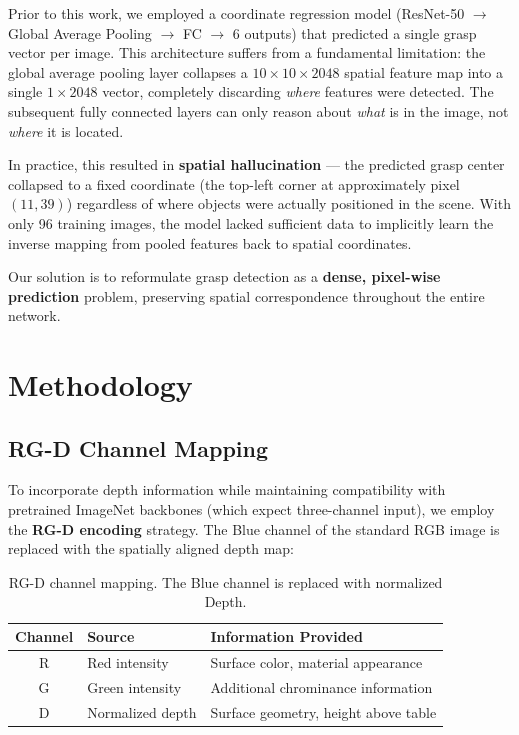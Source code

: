 \documentclass[12pt, a4paper]{article}
\begin{document}
Prior to this work, we employed a coordinate regression model (ResNet-50 $\rightarrow$ Global Average Pooling $\rightarrow$ FC $\rightarrow$ 6 outputs) that predicted a single grasp vector per image. This architecture suffers from a fundamental limitation: the global average pooling layer collapses a $10 \times 10 \times 2048$ spatial feature map into a single $1 \times 2048$ vector, completely discarding \textit{where} features were detected. The subsequent fully connected layers can only reason about \textit{what} is in the image, not \textit{where} it is located.

In practice, this resulted in \textbf{spatial hallucination} — the predicted grasp center collapsed to a fixed coordinate (the top-left corner at approximately pixel $(11, 39)$) regardless of where objects were actually positioned in the scene. With only 96 training images, the model lacked sufficient data to implicitly learn the inverse mapping from pooled features back to spatial coordinates.

Our solution is to reformulate grasp detection as a \textbf{dense, pixel-wise prediction} problem, preserving spatial correspondence throughout the entire network.

\section{Methodology}
\label{sec:method}

\subsection{RG-D Channel Mapping}

To incorporate depth information while maintaining compatibility with pretrained ImageNet backbones (which expect three-channel input), we employ the \textbf{RG-D encoding} strategy. The Blue channel of the standard RGB image is replaced with the spatially aligned depth map:

\begin{table}[H]
\centering
\caption{RG-D channel mapping. The Blue channel is replaced with normalized Depth.}
\label{tab:rgd}
\begin{tabular}{@{}cll@{}}
\toprule
\textbf{Channel} & \textbf{Source} & \textbf{Information Provided} \\
\midrule
R & Red intensity    & Surface color, material appearance \\
G & Green intensity  & Additional chrominance information \\
D & Normalized depth & Surface geometry, height above table \\
\bottomrule
\end{tabular}
\end{table}
\end{document}
